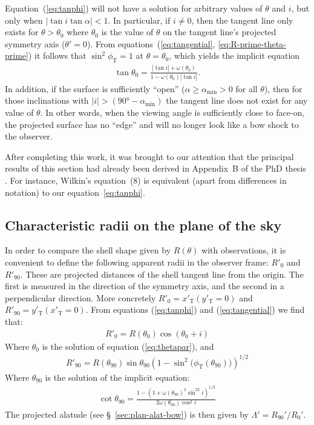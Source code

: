 \documentclass[useAMS, usenatbib, a4paper]{mnras}
\newcommand\T{_{\mathrm{\scriptscriptstyle T}}}
\begin{document}
Equation~(\ref{eq:tanphi}) will not have a solution for
arbitrary values of $\theta$ and $i$, but only when
$|\tan i\tan\alpha|<1$. In particular, if $i\neq 0$, then the tangent line
only exists for \(\theta > \theta_{0}\) where \(\theta_{0}\) is the value of
\(\theta\) on the tangent line's projected symmetry axis
(\(\theta' = 0\)).  From equations~(\ref{eq:tangential},
\ref{eq:R-prime-theta-prime}) it follows that \(\sin^2\phi\T = 1\) at
\(\theta = \theta_0\), which yields the implicit equation
\begin{align}
\tan\theta_{0} = \frac{|\tan i| + \omega(\theta_{0})}{1-\omega(\theta_{0}) |\tan i|} . 
\label{eq:thetapar}
\end{align}
In addition, if the surface is sufficiently ``open''
(\(\alpha \ge \alpha_{\mathrm{min}} > 0\) for all \(\theta\)), then for those
inclinations with
\(\vert i\vert > (\ang{90} - \alpha_{\mathrm{min}}) \) the tangent line does not exist
for any value of \(\theta\).  In other words, when the viewing angle is
sufficiently close to face-on, the projected surface has no ``edge''
and will no longer look like a bow shock to the observer.

After completing this work, it was brought to our attention that the
principal results of this section had already been derived in
Appendix~B of the PhD thesis \citet{Wilkin:1997a}.  For instance,
Wilkin's equation~(8) is equivalent (apart from differences in
notation) to our equation~\eqref{eq:tanphi}.

\subsection{Characteristic radii on the plane of the sky}

In order to compare the shell shape given by $R(\theta)$ with observations,
it is convenient to define the following apparent radii in the
observer frame: $R'_{0}$ and $R'_{90}$. These are projected distances
of the shell tangent line from the origin. The first is measured in
the direction of the symmetry axis, and the second in a perpendicular
direction. More concretely $R'_{0} = x'\T(y'\T=0)$ and
$R'_{90} = y'\T(x'\T=0)$. From equations (\ref{eq:tanphi}) and
(\ref{eq:tangential}) we find that:
\begin{align}
R'_{0} = R(\theta_{0})\cos(\theta_{0} + i) \label{eq:Rpar} 
\end{align}
Where $\theta_{0}$ is the solution of equation (\ref{eq:thetapar}), and
\begin{align}
  \label{eq:R90prime}
R'_{90} = R(\theta_{90})\sin\theta_{90}\left(1-\sin^2\bigl(\phi\T(\theta_{90})\bigr)\right)^{1/2}
\end{align}
Where $\theta_{90}$ is the solution of the implicit equation:
\begin{align}
  \label{eq:th90}
\cot\theta_{90} = \frac{1-\left(1+\omega(\theta_{90})^2\sin^22i\right)^{1/2}}{2\omega(\theta_{90})\cos^2 i}
\end{align}
The projected alatude (see \S~\ref{sec:plan-alat-bow}) is then given
by \(\Lambda' = R_{90}' / R_0'\).
\end{document}
